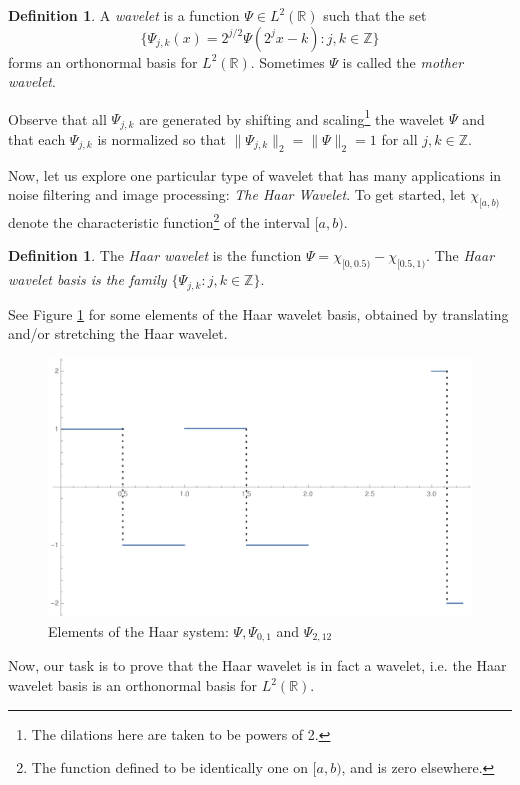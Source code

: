 \documentclass[11pt]{amsart}
\theoremstyle{theorem} %
\theoremstyle{definition}                  %
\newtheorem{defn}[thm]{Definition}
\theoremstyle{example}                       %
\theoremstyle{remark}                       %
\numberwithin{equation}{section}
\newcommand{\R}{\mathbb{R}}
\newcommand{\Z}{\mathbb{Z}}
\begin{document}
\begin{defn} \label{def: wavelet}
	A \emph{wavelet} is a function $ \varPsi \in L^2(\R) $ such that the set
	\[ \{ \varPsi_{j,k}(x) = 2^{j/2} \varPsi (2^j x-k): j,k \in \Z  \} \]
	forms an orthonormal basis for $ L^2(\R) $. Sometimes $ \varPsi $ is called the \emph{mother wavelet}.
\end{defn}

	Observe that all $ \varPsi_{j,k} $ are generated by shifting and scaling\footnote{The dilations here are taken to be powers of 2.} the wavelet $ \varPsi $ and that each $ \varPsi_{j,k} $ is normalized so that $ \| \varPsi_{j,k}\|_2 = \|\varPsi\|_2 = 1 $ for all $ j,k \in \Z $.
	
	Now, let us explore one particular type of wavelet that has many applications in noise filtering and image processing: \emph{The Haar Wavelet}. To get started, let $ \chi_{[a,b)} $ denote the characteristic function\footnote{The function defined to be identically one on $ [a,b) $, and is zero elsewhere.} of the interval $ [a,b) $.
	
\begin{defn}
	The \emph{Haar wavelet} is the function $ \varPsi = \chi_{[0,0.5)} - \chi_{[0.5,1)} $. The \emph{Haar wavelet basis is the family $ \{ \varPsi_{j,k}:j,k \in \Z \} $}.
\end{defn}
See Figure \ref{fig:haarsystem} for some elements of the Haar wavelet basis, obtained by translating and/or stretching the Haar wavelet. 

\begin{figure}[h]
	\centering
	\includegraphics[width=0.7\linewidth]{img/haar_system}
	\caption[Elements of the Haar system]{Elements of the Haar system: $ \varPsi, \varPsi_{0,1} $ and $ \varPsi_{2,12} $}
	\label{fig:haarsystem}
\end{figure}

Now, our task is to prove that the Haar wavelet is in fact a wavelet, i.e. the Haar wavelet basis is an orthonormal basis for $ L^2(\R) $.
\end{document}
